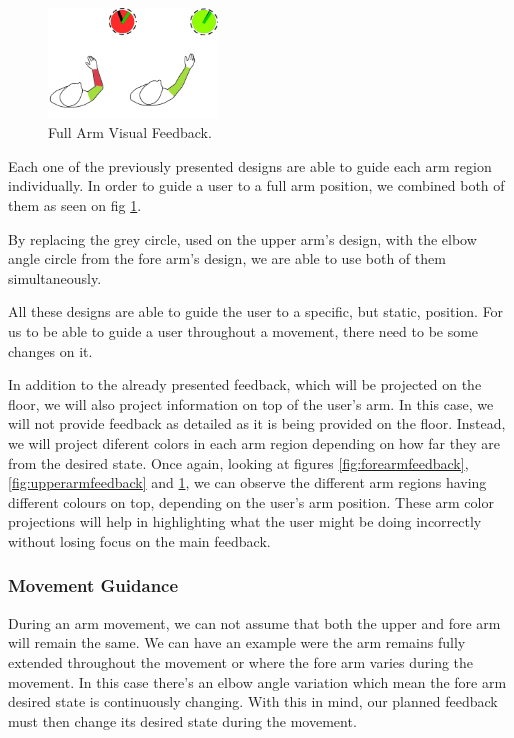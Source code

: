 \begin{figure}[!t]
    \begin{center}
        \includegraphics[width=0.4\textwidth]{imgs/approach/fullarmfeedback}
    \end{center}
    \caption{Full Arm Visual Feedback.}
    \label{fig:fullarmfeedback}
\end{figure}

Each one of the previously presented designs are able to guide each arm region individually.
In order to guide a user to a full arm position, we combined both of them as seen on fig \ref{fig:fullarmfeedback}.

By replacing the grey circle, used on the upper arm's design, with the elbow angle circle from the fore arm's design, we are able to use both of them simultaneously. 

All these designs are able to guide the user to a specific, but static, position. For us to be able to guide a user throughout a movement, there need to be some changes on it.

In addition to the already presented feedback, which will be projected on the floor, we will also project information on top of the user's arm. 
In this case, we will not provide feedback as detailed as it is being provided on the floor. 
Instead, we will project diferent colors in each arm region depending on how far they are from the desired state. 
Once again, looking at figures \ref{fig:forearmfeedback}, \ref{fig:upperarmfeedback} and \ref{fig:fullarmfeedback}, we can observe the 
different arm regions having different colours on top, depending on the user's arm position.
These arm color projections will help in highlighting what the user might be doing incorrectly without losing focus on the main feedback.

\subsubsection{Movement Guidance}
\label{sec:movementguidance}
During an arm movement, we can not assume that both the upper and fore arm will remain the same. 
We can have an example were the arm remains fully extended throughout the movement or where the fore arm varies during the movement. 
In this case there's an elbow angle variation which mean the fore arm desired state is continuously changing.
With this in mind, our planned feedback must then change its desired state during the movement.

